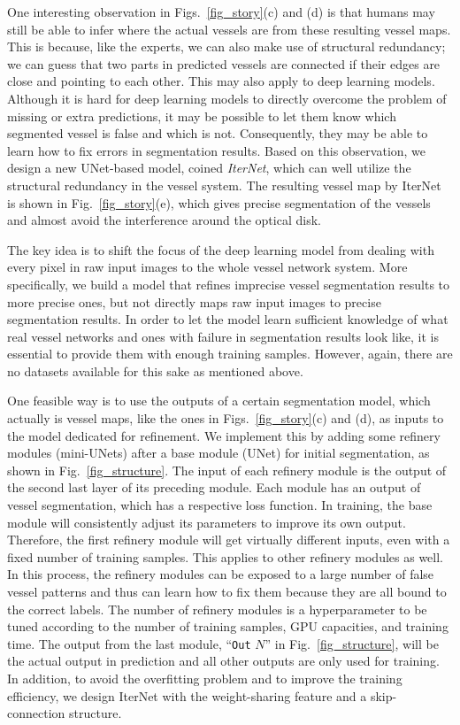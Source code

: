 \documentclass[10pt,twocolumn,letterpaper]{article}
\begin{document}
One interesting observation in Figs.~\ref{fig_story}(c) and (d) is that humans may still be able to infer where the actual vessels are from these resulting vessel maps. This is because, like the experts, we can also make use of structural redundancy; we can guess that two parts in predicted vessels are connected if their edges are close and pointing to each other. This may also apply to deep learning models. Although it is hard for deep learning models to directly overcome the problem of missing or extra predictions, it may be possible to let them know which segmented vessel is false and which is not. Consequently, they may be able to learn how to fix errors in segmentation results. Based on this observation, we design a new UNet-based model, coined \textit{IterNet}, which can well utilize the structural redundancy in the vessel system. The resulting vessel map by IterNet is shown in Fig.~\ref{fig_story}(e), which gives precise segmentation of the vessels and almost avoid the interference around the optical disk.

The key idea is to shift the focus of the deep learning model from dealing with every pixel in raw input images to the whole vessel network system. More specifically, we build a model that refines imprecise vessel segmentation results to more precise ones, but not directly maps raw input images to precise segmentation results. In order to let the model learn sufficient knowledge of what real vessel networks and ones with failure in segmentation results look like, it is essential to provide them with enough training samples. However, again, there are no datasets available for this sake as mentioned above. 

One feasible way is to use the outputs of a certain segmentation model, which actually is vessel maps, like the ones in Figs.~\ref{fig_story}(c) and (d), as inputs to the model dedicated for refinement. We implement this by adding some refinery modules (mini-UNets) after a base module (UNet) for initial segmentation, as shown in Fig.~\ref{fig_structure}. The input of each refinery module is the output of the second last layer of its preceding module. Each module has an output of vessel segmentation, which has a respective loss function. In training, the base module will consistently adjust its parameters to improve its own output. Therefore, the first refinery module will get virtually different inputs, even with a fixed number of training samples. This applies to other refinery modules as well. In this process, the refinery modules can be exposed to a large number of false vessel patterns and thus can learn how to fix them because they are all bound to the correct labels. The number of refinery modules is a hyperparameter to be tuned according to the number of training samples, GPU capacities, and training time. The output from the last module, ``\texttt{Out} $N$'' in Fig.~\ref{fig_structure}, will be the actual output in prediction and all other outputs are only used for training. In addition, to avoid the overfitting problem and to improve the training efficiency, we design IterNet with the weight-sharing feature and a skip-connection structure.
\end{document}
